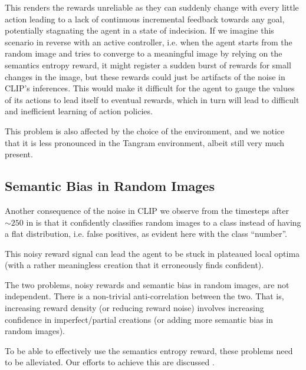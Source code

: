 This renders the rewards unreliable as they can suddenly change with every little action leading to a lack of continuous incremental feedback towards any goal, potentially stagnating the agent in a state of indecision.
If we imagine this scenario in reverse with an active controller, i.e. when the agent starts from the random image and tries to converge to a meaningful image by relying on the semantics entropy reward, it might register a sudden burst of rewards for small changes in the image, but these rewards could just be artifacts of the noise in CLIP's inferences.
This would make it difficult for the agent to gauge the values of its actions to lead itself to eventual rewards, which in turn will lead to difficult and inefficient learning of action policies.

This problem is also affected by the choice of the environment, and we notice that it is less pronounced in the Tangram environment, albeit still very much present.


\subsection{Semantic Bias in Random Images} %
\label{sec:inference-noise}
Another consequence of the noise in CLIP we observe from the timesteps after \(\sim 250\) in  is that it confidently classifies random images to a class instead of having a flat distribution, i.e. false positives, as evident here with the class ``number''.

This noisy reward signal can lead the agent to be stuck in plateaued local optima (with a rather meaningless creation that it erroneously finds confident).

The two problems, noisy rewards and semantic bias in random images, are not independent.
There is a non-trivial anti-correlation between the two.
That is, increasing reward density (or reducing reward noise) involves increasing confidence in imperfect/partial creations (or adding more semantic bias in random images).

To be able to effectively use the semantics entropy reward, these problems need to be alleviated.
Our efforts to achieve this are discussed .

